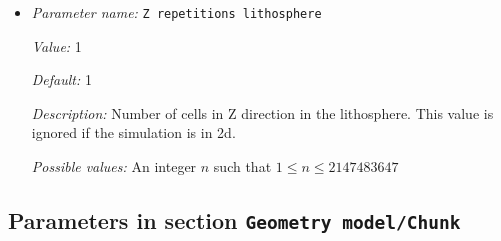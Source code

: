 \begin{itemize}
{\it Value:} 1


{\it Default:} 1


{\it Description:} Number of cells in Z direction of the lower box. This value is ignored if the simulation is in 2d.


{\it Possible values:} An integer $n$ such that $1\leq n \leq 2147483647$
\item {\it Parameter name:} {\tt Z repetitions lithosphere}
\label{parameters:Geometry model/Box with lithosphere boundary indicators/Z repetitions lithosphere}


{\it Value:} 1


{\it Default:} 1


{\it Description:} Number of cells in Z direction in the lithosphere. This value is ignored if the simulation is in 2d.


{\it Possible values:} An integer $n$ such that $1\leq n \leq 2147483647$
\end{itemize}

\subsection{Parameters in section \tt Geometry model/Chunk}
\label{parameters:Geometry_20model/Chunk}

